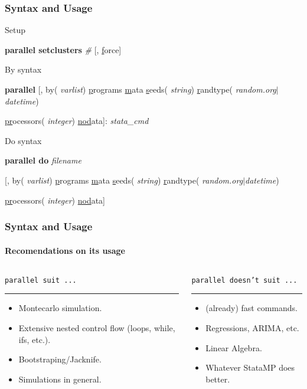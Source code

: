 \documentclass[9pt]{beamer}
\begin{document}
\begin{frame}
\frametitle{Syntax and Usage}

Setup

\begin{semiverbatim}
\footnotesize
{\bf parallel setclusters} {\it \#}  [, \uline{f}orce] 
\end{semiverbatim}\pause

By syntax

\begin{semiverbatim}
\footnotesize
{\bf parallel} [, by({\it \color{blue} varlist}) \uline{p}rograms \uline{m}ata \uline{s}eeds({\it \color{blue} string}) \uline{r}andtype({\it \color{blue} random.org$|$datetime})

\hspace{1cm} \uline{pr}ocessors({\it \color{blue} integer}) \uline{nod}ata]:  {\it stata\_cmd}
\end{semiverbatim}\pause

Do syntax

\begin{semiverbatim}
\footnotesize
{\bf parallel do} {\it \color{blue} filename}

\hspace{1cm} [, by({\it \color{blue} varlist}) \uline{p}rograms \uline{m}ata \uline{s}eeds({\it \color{blue} string}) \uline{r}andtype({\it \color{blue} random.org$|$datetime})

\hspace{1cm} \uline{pr}ocessors({\it \color{blue} integer}) \uline{nod}ata]
\end{semiverbatim}

\end{frame}


\begin{frame}
\frametitle{Syntax and Usage}
\framesubtitle{Recomendations on its usage}

\begin{columns}
\begin{column}{.5\textwidth}
{\color{gray}
{\tt parallel suit ...}
\rule{\linewidth}{4pt}}
\begin{itemize}
\item Montecarlo simulation.\pause
\item Extensive nested control flow (loops, while, ifs, etc.).\pause
\item Bootstraping/Jacknife.\pause
\item Simulations in general.\pause
\end{itemize}
\end{column}%
\hfill%
\begin{column}{.5\textwidth}
{\color{gray}
{\tt parallel doesn't suit ...}
\rule{\linewidth}{4pt}}
\begin{itemize}
\item (already) fast commands.\pause
\item Regressions, ARIMA, etc.\pause
\item Linear Algebra.\pause
\item Whatever StataMP does better.
\end{itemize}
\end{column}%
\end{columns}
\end{frame}
\end{document}
